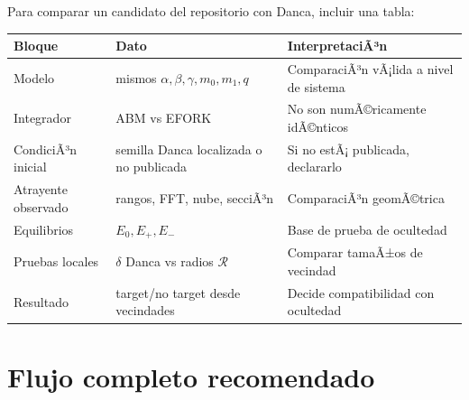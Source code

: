 \documentclass[11pt]{article}
\begin{document}
Para comparar un candidato del repositorio con Danca, incluir una tabla:

\begin{center}
\small
\begin{tabular}{@{}L{0.24\textwidth}L{0.27\textwidth}L{0.36\textwidth}@{}}
\toprule
Bloque & Dato & InterpretaciÃ³n\\
\midrule
Modelo & mismos \(\alpha,\beta,\gamma,m_0,m_1,q\) & ComparaciÃ³n vÃ¡lida a nivel de sistema\\
Integrador & ABM vs EFORK & No son numÃ©ricamente idÃ©nticos\\
CondiciÃ³n inicial & semilla Danca localizada o no publicada & Si no estÃ¡ publicada, declararlo\\
Atrayente observado & rangos, FFT, nube, secciÃ³n & ComparaciÃ³n geomÃ©trica\\
Equilibrios & \(E_0,E_+,E_-\) & Base de prueba de ocultedad\\
Pruebas locales & \(\delta\) Danca vs radios \(\mathcal R\) & Comparar tamaÃ±os de vecindad\\
Resultado & target/no target desde vecindades & Decide compatibilidad con ocultedad\\
\bottomrule
\end{tabular}
\end{center}

\section{Flujo completo recomendado}
\end{document}
